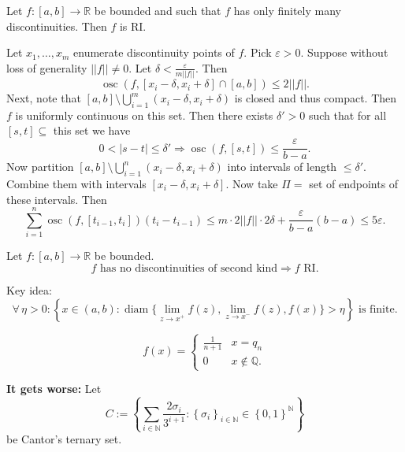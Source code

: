 \documentclass{notes}
\begin{document}
\begin{lem}
  Let $f \colon [a, b] \to \mathbb R$ be bounded and such that $f$ has only finitely many discontinuities.
  Then $f$ is RI.
\end{lem}

\begin{prf}
  Let $x_1, \dots, x_m$ enumerate discontinuity points of $f$.
  Pick $\varepsilon > 0$.
  Suppose without loss of generality $||f|| \neq 0$.
  Let $\delta < \frac{\varepsilon}{m ||f||}$.
  Then 
  \[
    \operatorname{osc}(f, [x_i - \delta, x_i + \delta] \cap [a, b]) \leq 2 ||f||.
  \]
  Next, note that $[a, b] \setminus \bigcup_{i = 1}^m (x_i - \delta, x_i + \delta)$ is closed and thus compact.
  Then $f$ is uniformly continuous on this set.
  Then there exists $\delta' > 0$ such that for all $[s, t] \subseteq $ this set we have 
  \[
    0 < \left | s - t \right | \leq \delta' \Rightarrow \operatorname{osc}(f, [s, t]) \leq \frac{\varepsilon}{b - a}.
  \]
  Now partition $[a, b] \setminus \bigcup_{i = 1}^n (x_i - \delta, x_i + \delta)$ into intervals of length $\leq \delta'$.
  Combine them with intervals $[x_i - \delta, x_i + \delta]$.
  Now take $\Pi = $ set of endpoints of these intervals.
  Then 
  \[
    \sum_{i = 1}^n \operatorname{osc}(f, [t_{i - 1}, t_i]) (t_i - t_{i - 1}) \leq m \cdot 2 ||f|| \cdot 2 \delta + \frac{\varepsilon}{b - a} (b - a) \leq 5 \varepsilon.
  \]
\end{prf}

\begin{lem}
  Let $f \colon [a, b] \to \mathbb R$ be bounded.
  \[
    \text{$f$ has no discontinuities of second kind} \Rightarrow \text{$f$ RI}.
  \]
\end{lem}

\begin{prf}
  Key idea: 
  \[
    \forall \, \eta > 0: \left \{ x \in (a, b) : \operatorname{diam}\{ \lim_{z \to x^+} f(z), \lim_{z \to x^-} f(z), f(x) \} > \eta \right \} \text{ is finite}.
  \]
\end{prf}

\begin{eg}
  \[
    f(x) = \begin{cases}
      \frac{1}{n + 1} & x = q_n \\ 
      0 & x \not \in \mathbb Q.
    \end{cases}
  \]
\end{eg}

{\boldmath \bfseries It gets worse:} Let 
\[ 
  C := \left \{ \sum_{i \in \mathbb N} \frac{2 \sigma_i}{3^{i + 1}} : \left \{ \sigma_i \right \}_{i \in \mathbb N} \in \left \{ 0, 1 \right \}^\mathbb N \right \}
\]
be Cantor's ternary set.
\end{document}
